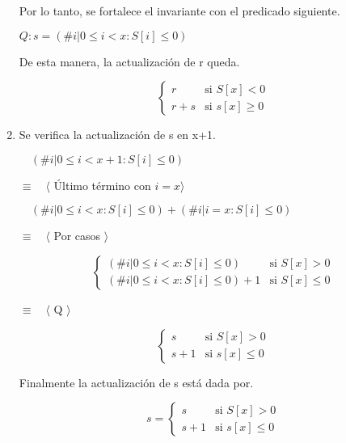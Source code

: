 \documentclass[hidelinks]{article}
\begin{document}
\begin{enumerate}
	      Por lo tanto, se fortalece el invariante con el predicado siguiente. \par

	      \begin{center}
		      $Q: s = (\# i| 0\leq i < x :S[i] \leq 0)$ \par
	      \end{center}

	      De esta manera, la actualización de r queda.

	      \begin{equation}
		      \begin{cases}
			      r     & \text{si } S[x] < 0    \\
			      r + s & \text{si } s[x] \geq 0
		      \end{cases}
	      \end{equation} \par

	\item Se verifica la actualización de s en x+1. \par
	      $\quad (\# i| 0\leq i < x+1 :S[i] \leq 0)$ \par
	      $\equiv \quad \langle$ Último término con $ i = x \rangle$ \par
	      $\quad (\# i| 0\leq i < x :S[i] \leq 0) + (\# i| i = x :S[i] \leq 0)$ \par
	      $\equiv \quad \langle$ Por casos $\rangle$ \par
	      \begin{equation}
		      \begin{cases}
			      (\# i| 0\leq i < x :S[i] \leq 0)     & \text{si } S[x] > 0    \\
			      (\# i| 0\leq i < x :S[i] \leq 0) + 1 & \text{si } S[x] \leq 0
		      \end{cases}
	      \end{equation} \par
	      $\equiv \quad \langle$ Q $ \rangle$ \par
	      \begin{equation}
		      \begin{cases}
			      s     & \text{si } S[x] > 0    \\
			      s + 1 & \text{si } s[x] \leq 0
		      \end{cases}
	      \end{equation} \par

	      Finalmente la actualización de s está dada por. \par
	      \begin{equation}
		      s =
		      \begin{cases}
			      s     & \text{si } S[x] > 0    \\
			      s + 1 & \text{si } s[x] \leq 0
		      \end{cases}
	      \end{equation} \par

\end{enumerate}
\end{document}
